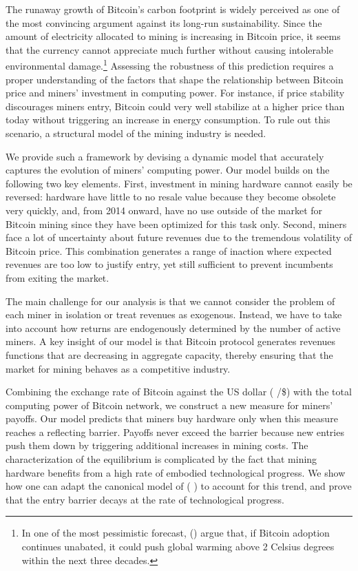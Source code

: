 \documentclass[12pt, a4paper]{article}
\def\bitcoinA{  \leavevmode
  \vtop{\offinterlineskip     \setbox0=\hbox{B}    \setbox2=\hbox to\wd0{\hfil\hskip-.00em
    \vrule height .3ex width .15ex\hskip .08em
    \vrule height .3ex width .15ex\hfil}
    \vbox{\copy2\box0}\box2}}
\begin{document}

The runaway growth of Bitcoin's carbon footprint
is widely perceived as one of the most convincing argument against
its long-run sustainability. Since the amount of electricity
allocated to mining is increasing in Bitcoin price, it seems that the currency
cannot appreciate much further without causing intolerable environmental damage.\footnote{In one of the most pessimistic forecast, \citeauthor{Mora} (\citeyear{Mora}) argue that,
if Bitcoin adoption continues unabated, it could push global warming above 2 Celsius degrees within the next three decades.}
Assessing the robustness of this prediction requires a proper understanding of the factors
that shape the relationship between Bitcoin price and miners' investment in computing power.
For instance, if price stability discourages miners entry, Bitcoin could very well stabilize at a higher price
than today without triggering an increase in energy consumption. To rule out this scenario, a structural model of the mining industry is needed.

We provide such a framework by devising a dynamic model that accurately
captures the evolution of miners' computing power.
Our model builds on the following two key elements. First, investment in mining hardware
cannot easily be reversed: hardware have little to no resale value because they become
obsolete very quickly, and, from 2014 onward, have no use outside of the
market for Bitcoin mining since they have been optimized for this task only. Second,
miners face a lot of uncertainty about future revenues due to the tremendous
volatility of Bitcoin price. This combination generates a
range of inaction where expected revenues are too low to justify entry, yet
still sufficient to prevent incumbents from exiting the market.

The main challenge for our analysis is that we cannot consider the problem
of each miner in isolation or treat revenues as exogenous. Instead, we have
to take into account how returns are endogenously determined by the number
of active miners. A key insight of our model is that Bitcoin protocol
generates revenues functions that are decreasing in aggregate capacity, thereby ensuring that the market
for mining behaves as a competitive industry.

Combining the exchange rate of Bitcoin against the US dollar (\bitcoinA /\$) with the total computing power
of Bitcoin network, we construct a new measure for miners' payoffs. Our
model predicts that miners buy hardware only when this measure reaches a
reflecting barrier. Payoffs never exceed the barrier because new entries push
them down by triggering additional increases in mining costs. The
characterization of the equilibrium is complicated by the fact that mining
hardware benefits from a high rate of embodied technological progress. We
show how one can adapt the canonical model of \citeauthor{CaballeroPyndick} (%
\citeyear{CaballeroPyndick}) to account for this trend, and prove that the
entry barrier decays at the rate of technological progress.
\end{document}
